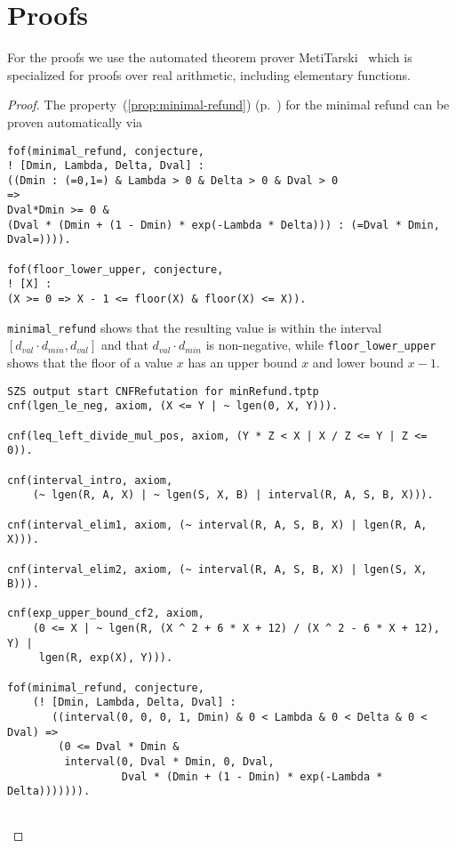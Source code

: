 \section{Proofs}
\label{sec:proofs}

\newif\ifproofs

For the proofs we use the automated theorem prover
MetiTarski~\cite{DBLP:journals/jar/AkbarpourP10} which is specialized for proofs
over real arithmetic, including elementary functions.

\begin{proof}
The property~(\ref{prop:minimal-refund}) (p.~\pageref{prop:minimal-refund}) for
the minimal refund can be proven automatically via

\begin{verbatim}
fof(minimal_refund, conjecture,
! [Dmin, Lambda, Delta, Dval] :
((Dmin : (=0,1=) & Lambda > 0 & Delta > 0 & Dval > 0
=>
Dval*Dmin >= 0 &
(Dval * (Dmin + (1 - Dmin) * exp(-Lambda * Delta))) : (=Dval * Dmin, Dval=)))).

fof(floor_lower_upper, conjecture,
! [X] :
(X >= 0 => X - 1 <= floor(X) & floor(X) <= X)).
\end{verbatim}
  \verb|minimal_refund| shows that the resulting value is within the interval
  $[d_{val}\cdot d_{min}, d_{val}]$ and that $d_{val}\cdot d_{min}$ is
  non-negative, while \verb|floor_lower_upper| shows that the floor of a value
  $x$ has an upper bound $x$ and lower bound $x - 1$.

\ifproofs
\begin{verbatim}
SZS output start CNFRefutation for minRefund.tptp
cnf(lgen_le_neg, axiom, (X <= Y | ~ lgen(0, X, Y))).

cnf(leq_left_divide_mul_pos, axiom, (Y * Z < X | X / Z <= Y | Z <= 0)).

cnf(interval_intro, axiom,
    (~ lgen(R, A, X) | ~ lgen(S, X, B) | interval(R, A, S, B, X))).

cnf(interval_elim1, axiom, (~ interval(R, A, S, B, X) | lgen(R, A, X))).

cnf(interval_elim2, axiom, (~ interval(R, A, S, B, X) | lgen(S, X, B))).

cnf(exp_upper_bound_cf2, axiom,
    (0 <= X | ~ lgen(R, (X ^ 2 + 6 * X + 12) / (X ^ 2 - 6 * X + 12), Y) |
     lgen(R, exp(X), Y))).

fof(minimal_refund, conjecture,
    (! [Dmin, Lambda, Delta, Dval] :
       ((interval(0, 0, 0, 1, Dmin) & 0 < Lambda & 0 < Delta & 0 < Dval) =>
        (0 <= Dval * Dmin &
         interval(0, Dval * Dmin, 0, Dval,
                  Dval * (Dmin + (1 - Dmin) * exp(-Lambda * Delta))))))).


\end{verbatim}
\end{proof}
